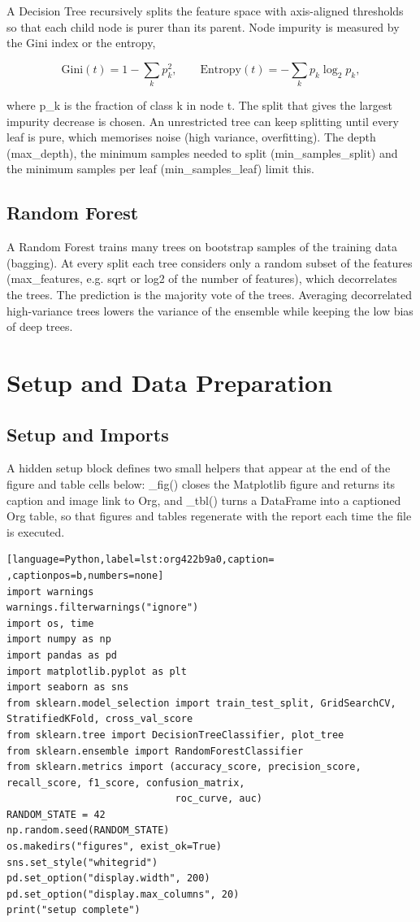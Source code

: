\documentclass[11pt]{article}
\begin{document}
A Decision Tree recursively splits the feature space with axis-aligned thresholds so that
each child node is purer than its parent. Node impurity is measured by the Gini index or the
entropy,

\[ \mathrm{Gini}(t) = 1 - \sum_{k} p_k^{2}, \qquad \mathrm{Entropy}(t) = -\sum_{k} p_k \log_2 p_k , \]

where p\_k is the fraction of class k in node t. The split that gives the largest impurity
decrease is chosen. An unrestricted tree can keep splitting until every leaf is pure, which
memorises noise (high variance, overfitting). The depth (max\_depth), the minimum samples
needed to split (min\_samples\_split) and the minimum samples per leaf (min\_samples\_leaf)
limit this.

\subsection*{Random Forest}
\label{sec:org7bb8ec0}


A Random Forest trains many trees on bootstrap samples of the training data (bagging). At
every split each tree considers only a random subset of the features (max\_features, e.g.
sqrt or log2 of the number of features), which decorrelates the trees. The prediction is the
majority vote of the trees. Averaging decorrelated high-variance trees lowers the variance
of the ensemble while keeping the low bias of deep trees.

\section*{Setup and Data Preparation}
\label{sec:org3d1c94f}


\subsection*{Setup and Imports}
\label{sec:org701168a}


A hidden setup block defines two small helpers that appear at the end of the figure and
table cells below: \_fig() closes the Matplotlib figure and returns its caption and image
link to Org, and \_tbl() turns a DataFrame into a captioned Org table, so that figures and
tables regenerate with the report each time the file is executed.
\begin{lstlisting}[language=Python,label=lst:org422b9a0,caption= ,captionpos=b,numbers=none]
import warnings
warnings.filterwarnings("ignore")
import os, time
import numpy as np
import pandas as pd
import matplotlib.pyplot as plt
import seaborn as sns
from sklearn.model_selection import train_test_split, GridSearchCV, StratifiedKFold, cross_val_score
from sklearn.tree import DecisionTreeClassifier, plot_tree
from sklearn.ensemble import RandomForestClassifier
from sklearn.metrics import (accuracy_score, precision_score, recall_score, f1_score, confusion_matrix,
                             roc_curve, auc)
RANDOM_STATE = 42
np.random.seed(RANDOM_STATE)
os.makedirs("figures", exist_ok=True)
sns.set_style("whitegrid")
pd.set_option("display.width", 200)
pd.set_option("display.max_columns", 20)
print("setup complete")
\end{lstlisting}
\end{document}
